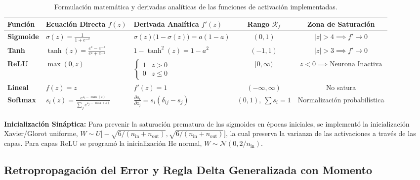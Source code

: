 \documentclass[11pt,letterpaper]{article}
\begin{document}
\begin{table}[htbp]
\centering
\small
\caption{Formulación matemática y derivadas analíticas de las funciones de activación implementadas.}
\label{tab:catalogo_activaciones}
\begin{adjustbox}{max width=\textwidth}
\begin{tabular}{l l l c c}
\toprule
\textbf{Función} & \textbf{Ecuación Directa $f(z)$} & \textbf{Derivada Analítica $f'(z)$} & \textbf{Rango $\mathcal{R}_f$} & \textbf{Zona de Saturación} \\
\midrule
\textbf{Sigmoide} & $\sigma(z) = \frac{1}{1 + e^{-z}}$ & $\sigma(z)\big(1 - \sigma(z)\big) = a(1 - a)$ & $(0, 1)$ & $|z| > 4 \implies f' \to 0$ \\
\textbf{Tanh} & $\tanh(z) = \frac{e^z - e^{-z}}{e^z + e^{-z}}$ & $1 - \tanh^2(z) = 1 - a^2$ & $(-1, 1)$ & $|z| > 3 \implies f' \to 0$ \\
\textbf{ReLU} & $\max(0, z)$ & $\begin{cases} 1 & z > 0 \\ 0 & z \le 0 \end{cases}$ & $[0, \infty)$ & $z < 0 \implies \text{Neurona Inactiva}$ \\
\textbf{Lineal} & $f(z) = z$ & $f'(z) = 1$ & $(-\infty, \infty)$ & No satura \\
\textbf{Softmax} & $s_i(z) = \frac{e^{z_i - \max(z)}}{\sum_j e^{z_j - \max(z)}}$ & $\frac{\partial s_i}{\partial z_j} = s_i(\delta_{ij} - s_j)$ & $(0, 1), \, \sum s_i = 1$ & Normalización probabilística \\
\bottomrule
\end{tabular}
\end{adjustbox}
\end{table}

\textbf{Inicialización Sináptica:} Para prevenir la saturación prematura de las sigmoides en épocas iniciales, se implementó la inicialización Xavier/Glorot uniforme, $W \sim U\big[-\sqrt{6/(n_{\text{in}}+n_{\text{out}})}, \sqrt{6/(n_{\text{in}}+n_{\text{out}})}\big]$, la cual preserva la varianza de las activaciones a través de las capas. Para capas ReLU se programó la inicialización He normal, $W \sim \mathcal{N}(0, 2/n_{\text{in}})$.

\subsection{Retropropagación del Error y Regla Delta Generalizada con Momento}
\end{document}
